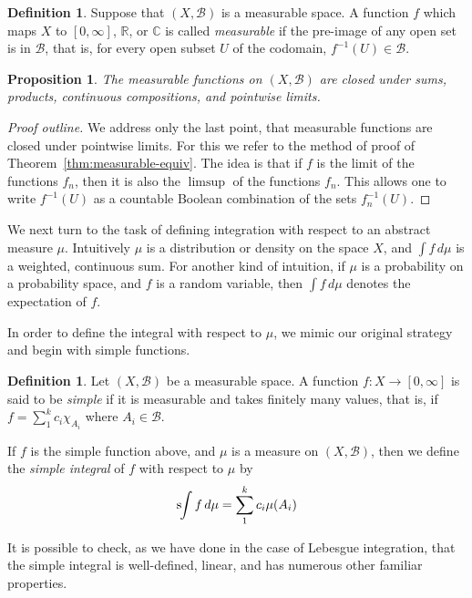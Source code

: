 \documentclass[10pt,oneside]{amsbook}
\newcommand{\RR}{{\mathbb R}}
\newcommand{\CC}{{\mathbb C}}
\newcommand{\sint}{\text{s}\kern-3pt\int}
\theoremstyle{definition}
\theoremstyle{plain}
\newtheorem{prop}[thm]{Proposition}
\theoremstyle{definition}
\newtheorem{defn}[thm]{Definition}
\theoremstyle{remark}
\numberwithin{equation}{section}
\numberwithin{figure}{section}
\begin{document}
\begin{defn}
  Suppose that $(X,\mathcal B)$ is a measurable space. A function $f$ which maps $X$ to $[0,\infty]$, $\RR$, or $\CC$ is called \emph{measurable} if the pre-image of any open set is in $\mathcal B$, that is, for every open subset $U$ of the codomain, $f^{-1}(U)\in\mathcal B$.
\end{defn}

\begin{prop}
  The measurable functions on $(X,\mathcal B)$ are closed under sums, products, continuous compositions, and pointwise limits.
\end{prop}

\begin{proof}[Proof outline]
  We address only the last point, that measurable functions are closed under pointwise limits. For this we refer to the method of proof of Theorem~\ref{thm:measurable-equiv}. The idea is that if $f$ is the limit of the functions $f_n$, then it is also the $\limsup$ of the functions $f_n$. This allows one to write $f^{-1}(U)$ as a countable Boolean combination of the sets $f_n^{-1}(U)$.
\end{proof}

We next turn to the task of defining integration with respect to an abstract measure $\mu$. Intuitively $\mu$ is a distribution or density on the space $X$, and $\int f\,d\mu$ is a weighted, continuous sum. For another kind of intuition, if $\mu$ is a probability on a probability space, and $f$ is a random variable, then $\int f\,d\mu$ denotes the expectation of $f$.

In order to define the integral with respect to $\mu$, we mimic our original strategy and begin with simple functions.

\begin{defn}
  Let $(X,\mathcal B)$ be a measurable space. A function $f\colon X\to[0,\infty]$ is said to be \emph{simple} if it is measurable and takes finitely many values, that is, if $f=\sum_1^kc_i\chi_{A_i}$ where $A_i\in\mathcal B$.

  If $f$ is the simple function above, and $\mu$ is a measure on $(X,\mathcal B)$, then we define the \emph{simple integral} of $f$ with respect to $\mu$ by
  \[\sint f\,d\mu=\sum_1^kc_i\mu(A_i)
  \]
\end{defn}

It is possible to check, as we have done in the case of Lebesgue integration, that the simple integral is well-defined, linear, and has numerous other familiar properties.
\end{document}
